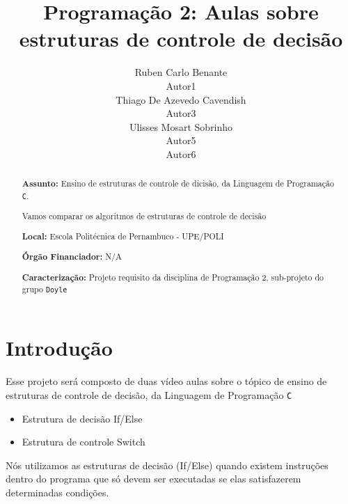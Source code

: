 \documentclass[a4paper,10pt]{article}  %
\title{ Programação 2: }
\title{ Aulas sobre estruturas de controle de decisão}
\author{Ruben Carlo Benante \\ Autor1 \\ Thiago De Azevedo Cavendish \\ Autor3 \\ Ulisses Mosart Sobrinho \\ Autor5 \\ Autor6 }
\begin{document}

\maketitle


\begin{abstract}

\textbf{Assunto:} Ensino de estruturas de controle de dicisão, da Linguagem de Programação \texttt{C}.

Vamos comparar os algoritmos de estruturas de controle de decisão %

\textbf{Local:} Escola Politécnica de Pernambuco - UPE/POLI

\textbf{Órgão Financiador:} N/A

\textbf{Caracterização:} Projeto requisito da disciplina de Programação 2, sub-projeto do grupo \texttt{Doyle}


\end{abstract}




\section{Introdução}


 Esse projeto será composto de duas vídeo aulas sobre o tópico de ensino de estruturas de controle de decisão,  da Linguagem de Programação \texttt{C}


\begin{itemize}

 \item Estrutura de decisão If/Else
 \item Estrutura de controle Switch
\end{itemize}



Nós utilizamos as estruturas de decisão (If/Else) quando existem instruções
dentro do programa que só devem ser executadas se elas satisfazerem  
determinadas condições.
\end{document}
